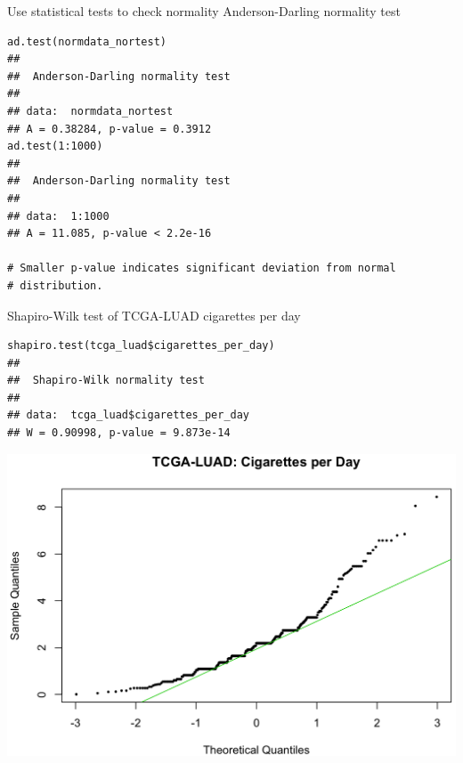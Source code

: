 \documentclass[12pt, t, xcolor=dvipsnames]{beamer}
\begin{document}
\begin{frame}[fragile]{Use statistical tests to check normality}
Anderson-Darling normality test

\begin{verbatim}
ad.test(normdata_nortest)
## 
##  Anderson-Darling normality test
## 
## data:  normdata_nortest
## A = 0.38284, p-value = 0.3912
ad.test(1:1000)
## 
##  Anderson-Darling normality test
## 
## data:  1:1000
## A = 11.085, p-value < 2.2e-16

# Smaller p-value indicates significant deviation from normal 
# distribution. 
\end{verbatim}

\end{frame}


\begin{frame}[fragile]{Shapiro-Wilk test of TCGA-LUAD cigarettes per day}
\begin{verbatim}
shapiro.test(tcga_luad$cigarettes_per_day)
## 
##  Shapiro-Wilk normality test
## 
## data:  tcga_luad$cigarettes_per_day
## W = 0.90998, p-value = 9.873e-14
\end{verbatim}
\includegraphics[height=0.6\textheight, keepaspectratio]{qqCpd}
\end{frame}
\end{document}
